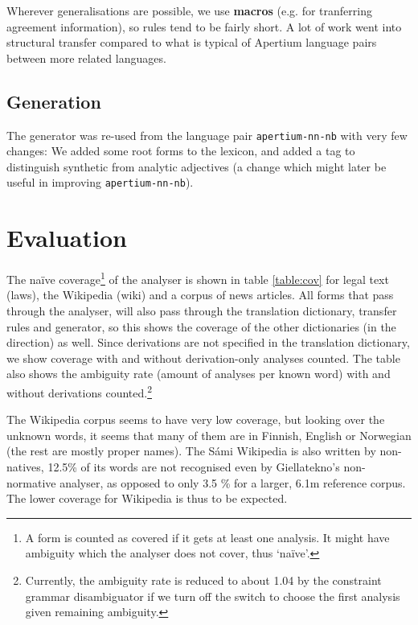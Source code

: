 Wherever generalisations are possible, we use \textbf{macros} (e.g.
for tranferring agreement information), so rules tend to be fairly
short. A lot of work went into structural transfer compared to what is
typical of Apertium language pairs between more related languages.

\subsection{Generation}
The generator was re-used from the language pair
\texttt{apertium-nn-nb} with very few changes: We added some root
forms to the lexicon, and added a tag to distinguish synthetic from analytic
adjectives (a change which might later be useful in improving
\texttt{apertium-nn-nb}).

\section{Evaluation}
\label{sec:eval}
The na\"{i}ve coverage\footnote{A form is counted as covered if it
  gets at least one analysis. It might have ambiguity which the
  analyser does not cover, thus `na\"{i}ve'.} of the analyser is shown
in table \ref{table:cov} for legal text (laws), the \sme{} Wikipedia
(wiki) and a corpus of \sme{} news articles. All forms that pass
through the analyser, will also pass through the translation
dictionary, transfer rules and generator, so this shows the coverage
of the other dictionaries (in the \smenob{} direction) as well. Since
derivations are not specified in the translation dictionary, we show
coverage with and without derivation-only analyses counted. The table
also shows the ambiguity rate (amount of analyses per known word) with
and without derivations counted.\footnote{Currently, the ambiguity
  rate is reduced to about 1.04 by the constraint grammar
  disambiguator if we turn off the switch to choose the first analysis
  given remaining ambiguity.}


The Wikipedia corpus seems to have very low coverage, but looking over
the unknown words, it seems that many of them are in Finnish, English
or Norwegian (the rest are mostly proper names). The S\'{a}mi Wikipedia
is also written by non-natives, 12.5\% of its words are not recognised
even by Giellatekno's non-normative analyser, as opposed to only 3.5 \% for
a larger, 6.1m reference corpus. The lower coverage for Wikipedia is thus to
be expected.



